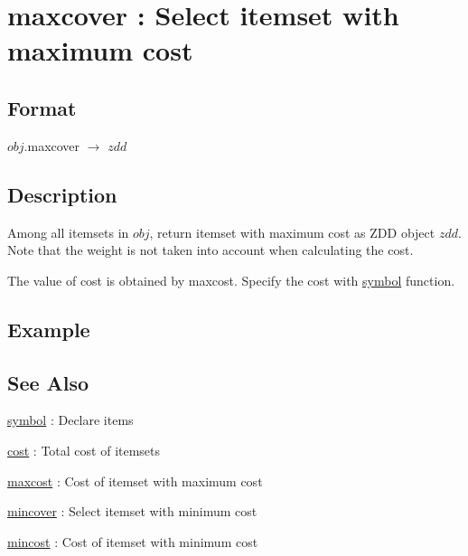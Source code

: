 
\section{maxcover : Select itemset with maximum cost\label{sect:maxcover}}
\subsection*{Format}
$obj$.maxcover $\rightarrow$ $zdd$

\subsection*{Description}
Among all itemsets in $obj$, return itemset with maximum cost as ZDD object $zdd$. 
Note that the weight is not taken into account when calculating the cost. 

The value of cost is obtained by maxcost. 
Specify the cost with \hyperref[sect:symbol]{symbol} function. 

\subsection*{Example}


\subsection*{See Also}
\hyperref[sect:symbol]{symbol} : Declare items

\hyperref[sect:cost]{cost} : Total cost of itemsets

\hyperref[sect:maxcost]{maxcost} : Cost of itemset with maximum cost

\hyperref[sect:mincover]{mincover} : Select itemset with minimum cost 

\hyperref[sect:mincost]{mincost} : Cost of itemset with minimum cost 


